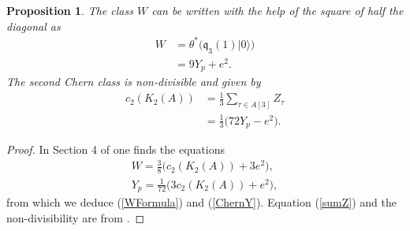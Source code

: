\documentclass{alggeom}
\newcommand{\vac}{|0\rangle}
\newcommand{\q}{\mathfrak{q}}
\newcommand{\kum}[2]{K_{ #2 }( #1 )}
\newcommand{\X}{\kum{A}{2}}
\newcommand{\cc}{c_2(\X)}
\theoremstyle{plain}
\newtheorem{proposition}[theorem]{Proposition}
\theoremstyle{definition}
\theoremstyle{remark}
\begin{document}
\begin{proposition}
The class $W$ can be written with the help of the square of half the diagonal as
\begin{align} 
W &= \theta^*\Big( \q_3(1)\vac \Big) \\
\label{WFormula}
&= 9 Y_p + e^2.
\end{align}
The second Chern class is non-divisible and given by 
\begin{align}
\label{sumZ}
\cc &= \frac{1}{3}\sum_{\tau\in A[3] } Z_\tau \\
\label{ChernY}
&= \frac{1}{3} \Big(72Y_p-e^2 \Big). 
\end{align}
\end{proposition}
\begin{proof} 
In Section 4 of \cite{Hassett} one finds the equations
\begin{gather}
W = \frac{3}{8}\Big(\cc + 3e^2\Big),\label{WW} \\
Y_p = \frac{1}{72}\Big(3\cc + e^2\Big),
\end{gather}
from which we deduce (\ref{WFormula}) and (\ref{ChernY}).
Equation (\ref{sumZ}) and the non-divisibility are from \cite[Proposition 5.1]{Hassett}.
\end{proof}
\end{document}
